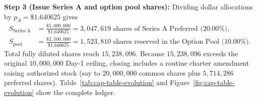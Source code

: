 \textbf{Step 3 (Issue Series A and option pool shares):} Dividing dollar allocations by $p_A = \$1.640625$ gives
\begin{align*}
  S_{\text{Series A}} &= \frac{\$5{,}000{,}000}{\$1.640625} = 3{,}047{,}619 \text{ shares of Series A Preferred ($20.00\%$)}, \\
  S_{\text{pool}}     &= \frac{\$2{,}500{,}000}{\$1.640625} = 1{,}523{,}810 \text{ shares reserved in the Option Pool ($10.00\%$)}.
\end{align*}
Total fully diluted shares reach $15{,}238{,}096$. Because $15{,}238{,}096$ exceeds the original $10{,}000{,}000$ Day-1 ceiling, closing includes a routine charter amendment raising authorized stock (say to $20{,}000{,}000$ common shares plus $5{,}714{,}286$ preferred shares). Table~\ref{tab:cap-table-evolution} and Figure~\ref{fig:cap-table-evolution} show the complete ledger.


